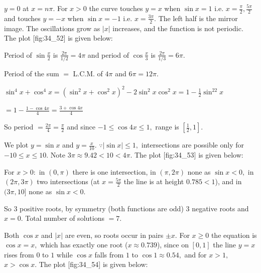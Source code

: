   $y = 0$ at $x = n\pi.$ For $x > 0$ the curve touches $y = x$ when $\sin x = 1$ i.e. $x = \frac{\pi}{2},
  \frac{5\pi}{2}$ and touches $y = -x$ when $\sin x = -1$ i.e. $x = \frac{3\pi}{2}.$ The left half is the mirror image.
  The oscillations grow as $|x|$ increases, and the function is not periodic. The plot [fig:34_52] is given
  below:

  \startplacefigure[title={Plot of $x\sin x$ and $y = \pm x$}, reference=fig:34_52]
    \externalfigure[34_52.pdf]
  \stopplacefigure

\item Period of $\sin\frac{x}{2}$ is $\frac{2\pi}{1/2} = 4\pi$ and period of $\cos\frac{x}{3}$ is $\frac{2\pi}{1/3} =
  6\pi.$

  Period of the sum $=$ L.C.M. of $4\pi$ and $6\pi = 12\pi.$

\item $\sin^4x + \cos^4x = (\sin^2x + \cos^2x)^2 - 2\sin^2x\cos^2x = 1 - \frac{1}{2}\sin^22x$

  $= 1 - \frac{1 - \cos4x}{4} = \frac{3 + \cos4x}{4}$

  So period $= \frac{2\pi}{4} = \frac{\pi}{2}$ and since $-1\leq\cos4x\leq1,$ range is $\left[\frac{1}{2}, 1\right].$

\item We plot $y = \sin x$ and $y = \frac{x}{10}.$ $\because |\sin x|\leq 1,$ intersections are possible only for
  $-10\leq x\leq 10.$ Note $3\pi\approx 9.42 < 10 < 4\pi.$ The plot [fig:34_53] is given below:

  \startplacefigure[title={Plot of $\sin x$ and $\frac{x}{10}$}, reference=fig:34_53]
    \externalfigure[34_53.pdf]
  \stopplacefigure

  For $x > 0:$ in $(0, \pi)$ there is one intersection, in $(\pi, 2\pi)$ none as $\sin x < 0,$ in $(2\pi, 3\pi)$ two
  intersections (at $x = \frac{5\pi}{2}$ the line is at height $0.785 < 1$), and in $(3\pi, 10]$ none as $\sin x < 0.$

  So $3$ positive roots, by symmetry (both functions are odd) $3$ negative roots and $x = 0.$ Total number of solutions
  $= 7.$

\item Both $\cos x$ and $|x|$ are even, so roots occur in pairs $\pm x.$ For $x\geq 0$ the equation is $\cos x = x,$
  which has exactly one root ($x\approx 0.739$), since on $[0, 1]$ the line $y = x$ rises from $0$ to $1$ while $\cos x$
  falls from $1$ to $\cos1\approx 0.54,$ and for $x > 1,$ $x > \cos x.$ The plot [fig:34_54] is given below:

